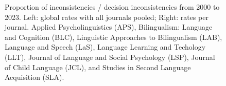 \documentclass[
  doc,
  longtable,
  nolmodern,
  notxfonts,
  notimes,
  colorlinks=true,linkcolor=blue,citecolor=blue,urlcolor=blue]{apa7}
\begin{document}
\begin{figure}

\caption{\label{fig-year-prop}Proportion of inconsistencies / decision
inconsistencies from 2000 to 2023. Left: global rates with all journals
pooled; Right: rates per journal. Applied Psycholinguistics (APS),
Bilingualism: Language and Cognition (BLC), Linguistic Approaches to
Bilingualism (LAB), Language and Speech (LaS), Language Learning and
Techology (LLT), Journal of Language and Social Psychology (LSP),
Journal of Child Language (JCL), and Studies in Second Language
Acquisition (SLA).}


\end{figure}%
\end{document}
